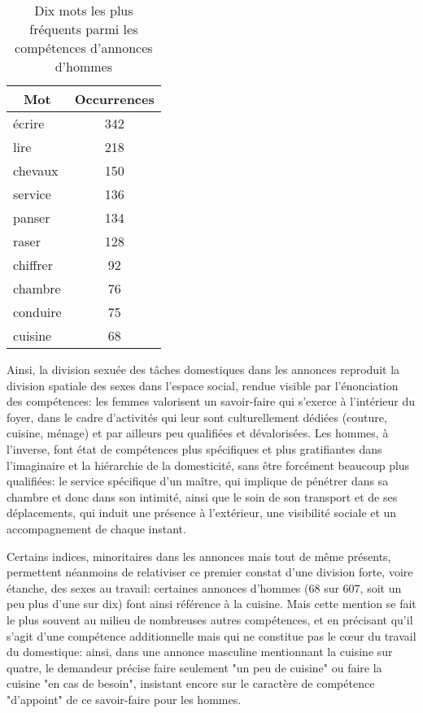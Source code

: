 \begin{table}[ht]
	\centering
	\begin{tabular}{|l|c|}
		\multicolumn{1}{|c|}{\textbf{Mot}} & \textbf{Occurrences} \\ \hline
		écrire                           & 342                  \\
		lire                             & 218                  \\
		chevaux                          & 150                  \\
		service                          & 136                  \\
		panser                           & 134                  \\
		raser                            & 128                  \\
		chiffrer                         & 92                   \\
		chambre                          & 76                   \\
		conduire                         & 75                   \\
		cuisine                          & 68                  
	\end{tabular}
	\caption{Dix mots les plus fréquents parmi les compétences d'annonces d'hommes}

\end{table}


Ainsi, la division sexuée des tâches domestiques dans les annonces reproduit la division spatiale des sexes dans l'espace social, rendue visible par l'énonciation des compétences: les femmes valorisent un savoir-faire qui s'exerce à l'intérieur du foyer, dans le cadre d'activités qui leur sont culturellement dédiées (couture, cuisine, ménage) et par ailleurs peu qualifiées et dévalorisées. Les hommes, à l'inverse, font état de compétences plus spécifiques et plus gratifiantes dans l'imaginaire et la hiérarchie de la domesticité, sans être forcément beaucoup plus qualifiées: le service spécifique d'un maître, qui implique de pénétrer dans sa chambre et donc dans son intimité, ainsi que le soin de son transport et de ses déplacements, qui induit une présence à l'extérieur, une visibilité sociale et un accompagnement de chaque instant. 

Certains indices, minoritaires dans les annonces mais tout de même présents, permettent néanmoins de relativiser ce premier constat d'une division forte, voire étanche, des sexes au travail: certaines annonces d'hommes (68 sur 607, soit un peu plus d'une sur dix) font ainsi référence à la cuisine. Mais cette mention se fait le plus souvent au milieu de nombreuses autres compétences, et en précisant qu'il s'agit d'une compétence additionnelle mais qui ne constitue pas le cœur du travail du domestique: ainsi, dans une annonce masculine mentionnant la cuisine sur quatre, le demandeur précise faire seulement "un peu de cuisine" ou faire la cuisine "en cas de besoin", insistant encore sur le caractère de compétence "d'appoint" de ce savoir-faire pour les hommes. 


